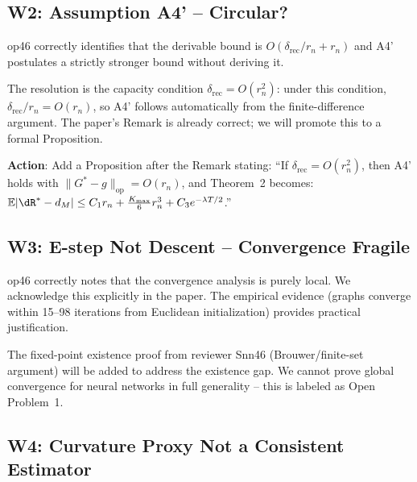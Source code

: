 \documentclass{article}
\begin{document}
\subsection{W2: Assumption A4' -- Circular?}

\begin{accept}
op46 correctly identifies that the derivable bound is $O(\delta_{\mathrm{rec}}/r_n
+ r_n)$ and A4' postulates a strictly stronger bound without deriving it.

The resolution is the capacity condition $\delta_{\mathrm{rec}} = O(r_n^2)$:
under this condition, $\delta_{\mathrm{rec}}/r_n = O(r_n)$, so A4' follows
automatically from the finite-difference argument. The paper's Remark is already
correct; we will promote this to a formal Proposition.

\textbf{Action}: Add a Proposition after the Remark stating:
``If $\delta_{\mathrm{rec}} = O(r_n^2)$, then A4' holds with
$\|G^* - g\|_{\mathrm{op}} = O(r_n)$, and Theorem~2 becomes:
$\mathbb{E}|\dR^* - d_M| \leq C_1 r_n + \frac{K_{\max}}{6}r_n^3 + C_3 e^{-\lambda T/2}$.''
\end{accept}

\subsection{W3: E-step Not Descent -- Convergence Fragile}

\begin{partial}
op46 correctly notes that the convergence analysis is purely local. We
acknowledge this explicitly in the paper. The empirical evidence (graphs
converge within 15--98 iterations from Euclidean initialization) provides
practical justification.

The fixed-point existence proof from reviewer Snn46 (Brouwer/finite-set
argument) will be added to address the existence gap. We cannot prove global
convergence for neural networks in full generality -- this is labeled as
Open Problem~1.
\end{partial}

\subsection{W4: Curvature Proxy Not a Consistent Estimator}
\end{document}
